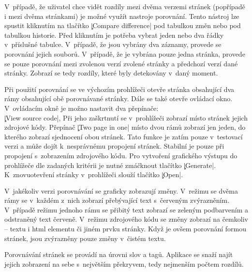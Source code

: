 V~případě, že uživatel chce vidět rozdíly mezi dvěma verzemi stránek (popřípadě i mezi dvěma stránkami) je možné využít nastroje porovnání.
Tento nástroj lze spustit kliknutím na tlačítko \c|Compare difference| pod tabulkou změn nebo pod tabulkou historie.
Před kliknutím je potřeba vybrat jeden nebo dva řádky v~příslušné tabulce.
V~případě, že jsou vybrány dva záznamy, provede se porovnání jejich souborů.
V~případě, že je vybrána pouze jedna stránka, provede se pouze porovnání mezi zvolenou verzí zvolené stránky a předchozí verzí dané stránky.
Zobrazí se tedy rozdíly, které byly detekovány v~daný moment.

Při použití porovnání se ve výchozím prohlížeči otevře stránka obsahující dva rámy obsahující obě porovnávané stránky.
Dále se také otevře ovládací okno.
V~ovládacím okně je možno nastavit dva přepínače:\\
\c|View source code|, Při jeho zaškrtnutí se v~prohlížeči zobrazí místo stránek jejich zdrojové kódy.
Přepínač \c|Two page in one| místo dvou rámů zobrazí jen jeden, do kterého zobrazí sjednocení obou stránek.
Tato funkce je zatím pouze v~testovací verzi a může dojít k~nesprávnému propojení stránek. Stabilní je pouze při propojení s~zobrazením zdrojového kódu.
Pro vytvoření grafického výstupu do prohlížeče dle zadaných kritérii je nutné zmáčknout tlačítko \c|Generate|.
K~znovuotevření stránky v~prohlížeči slouží tlačítko \c|Open|.

V~jakékoliv verzi porovnávání se graficky zobrazují změny.
V~režimu se dvěma rámy se v~každém z~nich zobrazí přebývající text s~červeným zvýrazněním.
V~případě režimu jednoho rámu se přibitý text zobrazí se zeleným podbarvením a odstraněný text červeně.
V~režimu zdrojového kódu se změny zobrazí na čemkoliv -- textu i html elementu či jiném prvku stránky.
Když je ovšem porovnání formou stránek, jsou zvýrazněny pouze změny v~čistém textu.

Porovnávání stránek se provádí na úrovni slov a tagů.
Aplikace se snaží najít jejich zobrazení na sebe s~největším překryvem,  tedy nejmenším počtem rozdílů.
